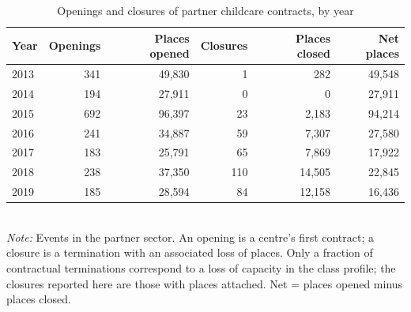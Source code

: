 \begin{table}[htbp]\centering
\caption{Openings and closures of partner childcare contracts, by year}
\label{tab:T7b_aber_fech}
\small
\setlength{\tabcolsep}{4pt}
\begin{tabular}{lrrrrr}
\toprule
Year & Openings & Places opened & Closures & Places closed & Net places \\
\midrule
2013 & 341 & 49,830 & 1 & 282 & 49,548 \\
2014 & 194 & 27,911 & 0 & 0 & 27,911 \\
2015 & 692 & 96,397 & 23 & 2,183 & 94,214 \\
2016 & 241 & 34,887 & 59 & 7,307 & 27,580 \\
2017 & 183 & 25,791 & 65 & 7,869 & 17,922 \\
2018 & 238 & 37,350 & 110 & 14,505 & 22,845 \\
2019 & 185 & 28,594 & 84 & 12,158 & 16,436 \\
\bottomrule
\end{tabular}
\\[3pt]{\footnotesize \textit{Note:} Events in the partner sector. An opening is a centre's first contract; a closure is a termination with an associated loss of places. Only a fraction of contractual terminations correspond to a loss of capacity in the class profile; the closures reported here are those with places attached. Net = places opened minus places closed.}
\end{table}
